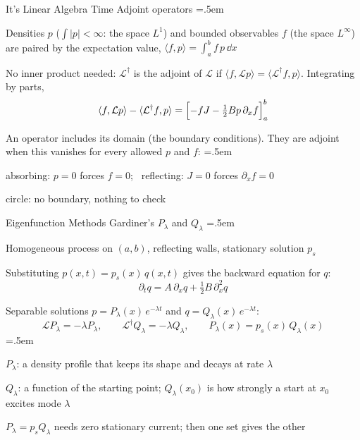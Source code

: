 \documentclass[xcolor={dvipsnames},t]{beamer}
\let\olditemize=\itemize
\let\endolditemize=\enditemize
\renewenvironment{itemize}{\olditemize \itemsep=.5em }{\endolditemize}
\newcommand{\Lop}{\mathcal{L}}
\begin{document}
\begin{frame}{It's Linear Algebra Time}
    \alert{Adjoint operators}
    \begin{itemize}
        \item<2-> Densities $p$ ($\int|p|<\infty$: the space $L^1$) and bounded observables $f$ (the space $L^\infty$) are paired by the expectation value, $\langle f,p\rangle = \int_a^b f\,p\,\dd x$
        \item<3-> No inner product needed: $\Lop^\dagger$ is the adjoint of $\Lop$ if $\langle f,\Lop p\rangle=\langle\Lop^\dagger f,p\rangle$. Integrating by parts,
        \[ \langle f,\Lop p\rangle - \langle\Lop^\dagger f,p\rangle = \Bigl[-fJ - \tfrac12Bp\,\partial_xf\Bigr]_a^b \]
        \item<4-> An operator includes its domain (the boundary conditions). They are adjoint when this vanishes for every allowed $p$ and $f$:
        \begin{itemize}
            \item<5-> absorbing: $p=0$ forces $f=0$; \ reflecting: $J=0$ forces $\partial_xf=0$
            \item<6-> circle: no boundary, nothing to check
        \end{itemize}
    \end{itemize}
\end{frame}

\begin{frame}{Eigenfunction Methods}
    \alert{Gardiner's $P_\lambda$ and $Q_\lambda$}
    \begin{itemize}
        \item<2-> Homogeneous process on $(a,b)$, reflecting walls, stationary solution $p_s$
        \item<3-> Substituting $p(x,t)=p_s(x)\,q(x,t)$ gives the backward equation for $q$:
        \[ \partial_tq = A\,\partial_xq + \tfrac12B\,\partial_x^2q \]
        \item<4-> Separable solutions $p=P_\lambda(x)\,e^{-\lambda t}$ and $q=Q_\lambda(x)\,e^{-\lambda t}$:
        \[ \Lop P_\lambda=-\lambda P_\lambda,\qquad \Lop^\dagger Q_\lambda=-\lambda Q_\lambda,\qquad P_\lambda(x)=p_s(x)\,Q_\lambda(x) \]
        \vspace{-1.5em}
        \begin{itemize}
            \item<5-> $P_\lambda$: a density profile that keeps its shape and decays at rate $\lambda$
            \item<6-> $Q_\lambda$: a function of the starting point; $Q_\lambda(x_0)$ is how strongly a start at $x_0$ excites mode $\lambda$
            \item<7-> $P_\lambda=p_sQ_\lambda$ needs zero stationary current; then one set gives the other
        \end{itemize}
    \end{itemize}
\end{frame}
\end{document}
